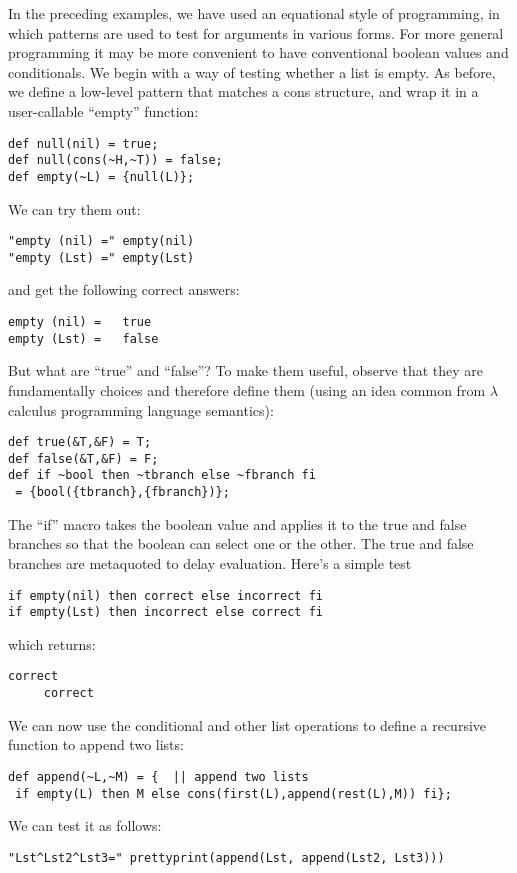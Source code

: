 \documentclass[12pt]{article}
\begin{document}
In the preceding examples, we have used an equational style of programming, in which patterns are used to test for arguments in various forms.
For more general programming it may be more convenient to have conventional boolean values and conditionals.
We begin with a way of testing whether a list is empty.
As before, we define a low-level pattern that matches a cons structure, and wrap it in a user-callable ``empty'' function:
\begin{lstlisting}[frame=single,language=func]
def null(nil) = true;
def null(cons(~H,~T)) = false;
def empty(~L) = {null(L)};
\end{lstlisting}
We can try them out:
\begin{lstlisting}[frame=single]
"empty (nil) =" empty(nil)
"empty (Lst) =" empty(Lst)
\end{lstlisting}
and get the following correct answers:
\begin{lstlisting}[frame=single]
empty (nil) =   true
empty (Lst) =   false
\end{lstlisting}
But what are ``true'' and ``false''?
To make them useful, observe that they are fundamentally choices and therefore define them (using an idea common from $\lambda$ calculus programming language semantics):
\begin{lstlisting}[frame=single,language=func]
def true(&T,&F) = T;
def false(&T,&F) = F;
def if ~bool then ~tbranch else ~fbranch fi  
 = {bool({tbranch},{fbranch})};
\end{lstlisting}
The ``if'' macro takes the boolean value and applies it to the true and false branches so that the boolean can select one or the other.
The true and false branches are metaquoted to delay evaluation.
Here's a simple test
\begin{lstlisting}[frame=single]
if empty(nil) then correct else incorrect fi
if empty(Lst) then incorrect else correct fi
\end{lstlisting}
which returns:
\begin{lstlisting}[frame=single]
     correct     
     correct
\end{lstlisting}
We can now use the conditional and other list operations to define a recursive function to append two lists:
\begin{lstlisting}[frame=single,language=func]
def append(~L,~M) = {  || append two lists
 if empty(L) then M else cons(first(L),append(rest(L),M)) fi};
\end{lstlisting}
We can test it as follows:
\begin{lstlisting}[frame=single]
"Lst^Lst2^Lst3=" prettyprint(append(Lst, append(Lst2, Lst3)))
\end{lstlisting}
\end{document}
